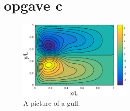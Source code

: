 \section{opgave c}

\begin{figure}
  \caption{A picture of a gull.}
  \centering
    \includegraphics[width=0.5\textwidth]{fig3d.eps}
\end{figure}